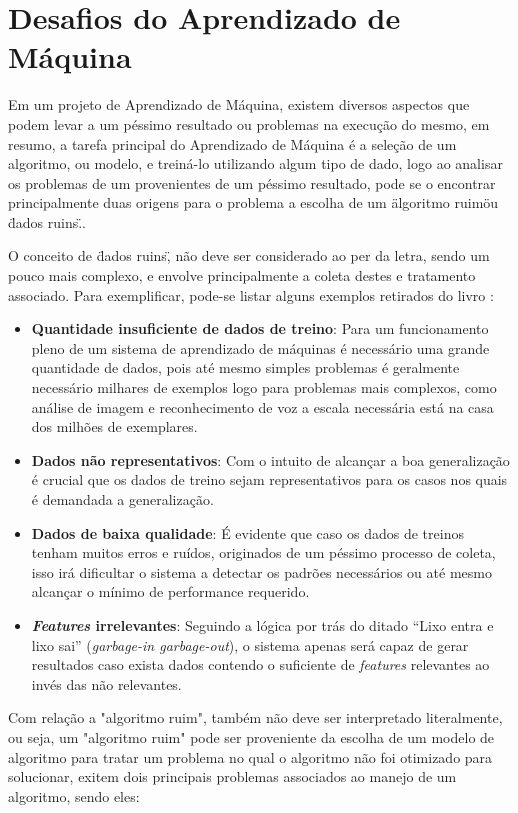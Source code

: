\section{Desafios do Aprendizado de Máquina}
Em um projeto de Aprendizado de Máquina, existem diversos aspectos que podem levar a um péssimo resultado ou problemas na execução do mesmo, em resumo, a tarefa principal do Aprendizado de Máquina é a seleção de um algoritmo, ou modelo, e treiná-lo utilizando algum tipo de dado, logo ao analisar os problemas de um provenientes de um péssimo resultado, pode se o encontrar principalmente duas origens para o problema a escolha de um \"algoritmo ruim\" ou  \"dados ruins\".\cite{geron2017hands}.

O conceito de \"dados ruins\", não deve ser considerado ao per da letra, sendo um pouco mais complexo, e envolve principalmente a coleta destes e tratamento associado. Para exemplificar,  pode-se listar alguns exemplos retirados do livro \cite{geron2017hands}:

\begin{itemize}
    \item \textbf{Quantidade insuficiente de dados de treino}: Para um funcionamento pleno de um sistema de aprendizado de máquinas é necessário uma grande quantidade de dados, pois até mesmo simples problemas é geralmente necessário milhares de exemplos logo para problemas mais complexos, como análise de imagem e reconhecimento de voz a escala necessária está na casa dos milhões de exemplares.
    \item \textbf{Dados não representativos}: Com o intuito de alcançar a boa generalização é crucial que os dados de treino sejam representativos para os casos nos quais é demandada a generalização.
    \item \textbf{Dados de baixa qualidade}: É evidente que caso os dados de treinos tenham muitos erros e ruídos, originados de um péssimo processo de coleta, isso irá dificultar o sistema a detectar os padrões necessários ou até mesmo alcançar o mínimo de performance requerido.
    \item \textbf{\textit{Features}  irrelevantes}: Seguindo a lógica por trás do ditado “Lixo entra e lixo sai” (\textit{garbage-in garbage-out}), o sistema apenas será capaz de gerar resultados caso exista dados contendo o suficiente de \textit{features} relevantes ao invés das não relevantes.
\end{itemize}

Com relação a "algoritmo ruim", também não deve ser interpretado literalmente, ou seja, um "algoritmo ruim" pode ser proveniente da escolha de um modelo de algoritmo para tratar um problema no qual o algoritmo não foi otimizado para solucionar, exitem dois principais problemas associados ao manejo de um algoritmo, sendo eles:

